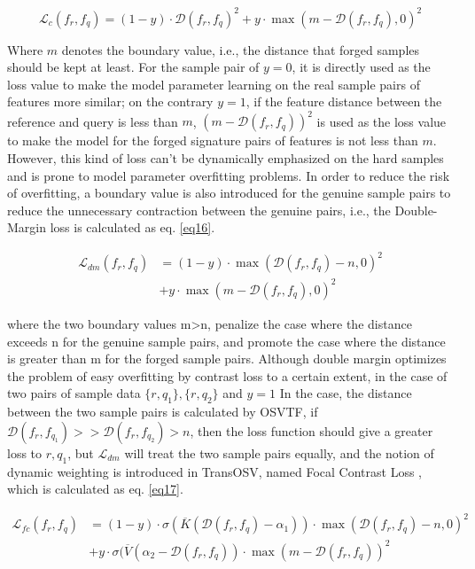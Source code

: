 \begin{equation}
\label{eq15}
  \mathcal{L}_c (f_r,f_q ) = (1 - y)\cdot \mathcal{D}(f_r,f_q)^2 + y\cdot \max⁡(m - \mathcal{D}(f_r,f_q),0)^2 
\end{equation}

Where $m$ denotes the boundary value, i.e., the distance that forged samples should be kept at least. For the sample pair of $y=0$, it is directly used as the loss value to make the model parameter learning on the real sample pairs of features more similar; on the contrary $y=1$, if the feature distance between the reference and query is less than $m$, $(m - \mathcal{D}(f_r,f_q ))^2$ is used as the loss value to make the model for the forged signature pairs of features is not less than $m$. However, this kind of loss can't be dynamically emphasized on the hard samples and is prone to model parameter overfitting problems. In order to reduce the risk of overfitting, a boundary value is also introduced for the genuine sample pairs to reduce the unnecessary contraction between the genuine pairs, i.e., the Double-Margin loss \cite{25} is calculated as eq. \ref{eq16}.

\begin{equation}
\label{eq16}
\begin{aligned}
  \mathcal{L}_{dm} (f_r,f_q ) &= (1-y)\cdot \max(\mathcal{D}(f_r,f_q )-n,0)^2 \\
  &+ y\cdot \max⁡(m-\mathcal{D}(f_r,f_q),0)^2
\end{aligned}  
\end{equation}

where the two boundary values m>n, penalize the case where the distance exceeds n for the genuine sample pairs, and promote the case where the distance is greater than m for the forged sample pairs. Although double margin optimizes the problem of easy overfitting by contrast loss to a certain extent, in the case of two pairs of sample data $\{r,q_1 \},\{r,q_2\}$ and $y=1$ In the case, the distance between the two sample pairs is calculated by OSVTF, if $\mathcal{D}(f_r,f_{q_1}) >> \mathcal{D}(f_r,f_{q_2}) > n $, then the loss function should give a greater loss to ${r,q_1}$, but $\mathcal{L}_{dm}$ will treat the two sample pairs equally, and the notion of dynamic weighting is introduced in TransOSV, named Focal Contrast Loss \cite{41}, which is calculated as eq. \ref{eq17}.

\begin{equation}
\label{eq17}
\begin{aligned}
  \mathcal{L}_{fc}(f_r,f_q ) &= (1 - y)\cdot \sigma(\overline{K}(\mathcal{D}(f_r,f_q )-\alpha_1 ))\cdot \max⁡(\mathcal{D}(f_r,f_q)-n,0)^2 \\
  &+ y\cdot \sigma(\overline{V} (\alpha_2 - \mathcal{D}(f_r,f_q))\cdot \max⁡(m - \mathcal{D}(f_r,f_q ))^2 \\
\end{aligned}
\end{equation}

